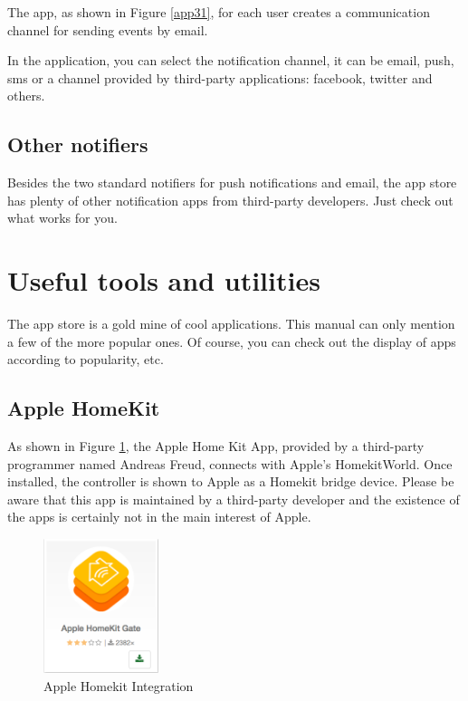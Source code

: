 The  app, as shown in Figure \ref{app31}, for each user creates a communication channel for sending events by email.

In the  application, you can select the notification channel, it can be email, push, sms or a channel provided by third-party applications: facebook, twitter and others. 

\subsection{Other notifiers}

Besides the two standard notifiers for push notifications and email, the app store has 
plenty of other notification apps from third-party developers. Just check out what works for you.

\section{Useful tools and utilities}

The app store is a gold mine of cool applications. This manual can only mention a few of 
the more popular ones. Of course, you can check out the display of apps according to popularity, etc.

\subsection{Apple HomeKit}

As shown in Figure \ref{app40}, the Apple Home Kit App, provided by a third-party programmer 
named Andreas Freud, connects \zway with Apple’s HomekitWorld. Once installed, the \zway 
controller is shown to Apple as a Homekit bridge device. Please be aware that this app is 
maintained by a third-party developer and the existence of the apps is certainly not in 
the main interest of Apple.

\begin{figure}
\begin{center}
\includegraphics[width=0.3\textwidth]{pngs/cap6/app40.png}
\caption{Apple Homekit Integration}
\label{app40}
\end{center}
\end{figure}

